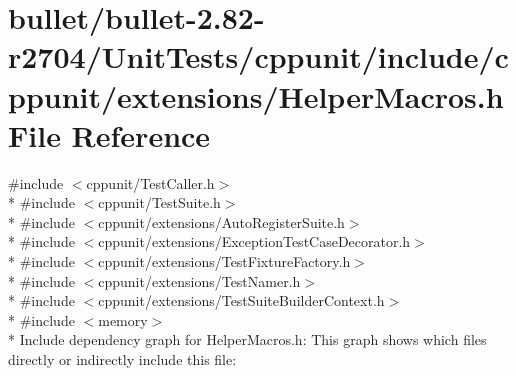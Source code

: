 \hypertarget{bullet_2bullet-2_882-r2704_2_unit_tests_2cppunit_2include_2cppunit_2extensions_2_helper_macros_8h}{\section{bullet/bullet-\/2.82-\/r2704/\+Unit\+Tests/cppunit/include/cppunit/extensions/\+Helper\+Macros.h File Reference}
\label{bullet_2bullet-2_882-r2704_2_unit_tests_2cppunit_2include_2cppunit_2extensions_2_helper_macros_8h}
}
{\ttfamily \#include $<$cppunit/\+Test\+Caller.\+h$>$}\\*
{\ttfamily \#include $<$cppunit/\+Test\+Suite.\+h$>$}\\*
{\ttfamily \#include $<$cppunit/extensions/\+Auto\+Register\+Suite.\+h$>$}\\*
{\ttfamily \#include $<$cppunit/extensions/\+Exception\+Test\+Case\+Decorator.\+h$>$}\\*
{\ttfamily \#include $<$cppunit/extensions/\+Test\+Fixture\+Factory.\+h$>$}\\*
{\ttfamily \#include $<$cppunit/extensions/\+Test\+Namer.\+h$>$}\\*
{\ttfamily \#include $<$cppunit/extensions/\+Test\+Suite\+Builder\+Context.\+h$>$}\\*
{\ttfamily \#include $<$memory$>$}\\*
Include dependency graph for Helper\+Macros.\+h\+:
This graph shows which files directly or indirectly include this file\+:
